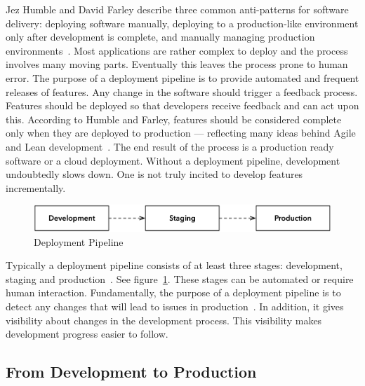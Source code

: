 \documentclass[english]{tktltiki2}
\begin{document}
Jez Humble and David Farley describe three common anti-patterns for software delivery: deploying software manually, deploying to a production-like environment only after development is complete, and manually managing production environments~\cite{HF11}. Most applications are rather complex to deploy and the process involves many moving parts. Eventually this leaves the process prone to human error. The purpose of a deployment pipeline is to provide automated and frequent releases of features. Any change in the software should trigger a feedback process. Features should be deployed so that developers receive feedback and can act upon this. According to Humble and Farley, features should be considered complete only when they are deployed to production — reflecting many ideas behind Agile and Lean development~\cite{HF11}. The end result of the process is a production ready software or a cloud deployment. Without a deployment pipeline, development undoubtedly slows down. One is not truly incited to develop features incrementally.

\begin{figure}[h!]

    \centering
    \vspace{1cm}

    \includegraphics[scale = 0.6]{figures/deployment-pipeline}

    \caption{Deployment Pipeline}
    \label{figure:deployment-pipeline}

    \vspace{1cm}

\end{figure}

Typically a deployment pipeline consists of at least three stages: development, staging and production~\cite{HF11}. See figure~\ref{figure:deployment-pipeline}. These stages can be automated or require human interaction. Fundamentally, the purpose of a deployment pipeline is to detect any changes that will lead to issues in production~\cite{Fow13b}. In addition, it gives visibility about changes in the development process. This visibility makes development progress easier to follow.

\subsection{From Development to Production}
\end{document}
